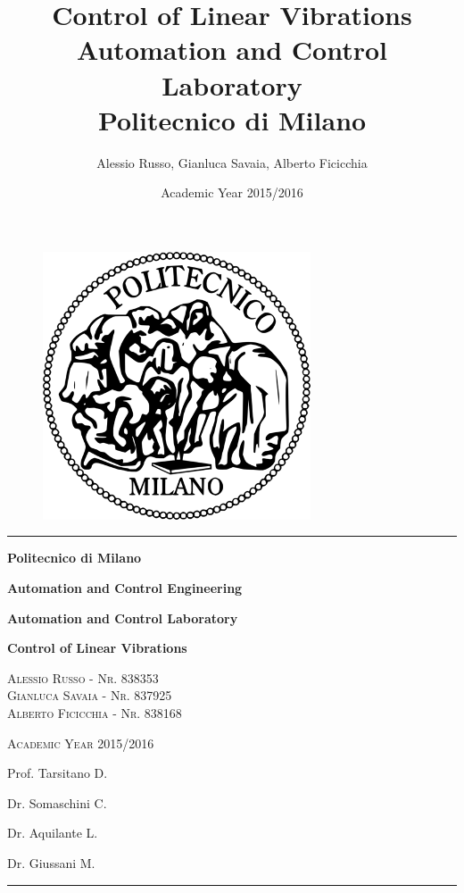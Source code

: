 \documentclass[10pt,a4paper,titlepage]{report}
\author{Alessio Russo, Gianluca Savaia, Alberto Ficicchia}
\title{Control of Linear Vibrations \\
\Large Automation and Control Laboratory \\
 Politecnico di Milano}
\date{Academic Year 2015/2016}
\begin{document}
\begin{titlepage}

\centering		
\vspace{3cm}
\begin{figure}[!h]
\centering
  \includegraphics[scale=0.7]{img/logo.png} 
\end{figure}
\rule{\textwidth}{1pt}
 \par 
\vspace{2cm}
{\Large\bfseries Politecnico di Milano \par}
{\Large\bfseries Automation and Control Engineering\par}
\vspace{2cm}
{\Large\bfseries Automation and Control Laboratory\par}
{\huge\bfseries Control of Linear Vibrations\par}
\vspace{0.3cm}
{\large\scshape Alessio Russo \hspace{8mm} - Nr. 838353 \\ Gianluca Savaia \hspace{3mm} - Nr. 837925 \\ Alberto Ficicchia  - Nr. 838168\par}
\vspace{0.3cm}
{\scshape Academic Year 2015/2016\par}
\vspace{3.5cm}
\hspace{12cm}
{ Prof. Tarsitano D.\par}
\hspace{12cm}
{ Dr. Somaschini C.\par}
\hspace{11.75cm}
{ Dr. Aquilante L.\par}
\hspace{11.65cm}
{ Dr. Giussani M.\par}
\rule{\textwidth}{1pt}
\end{titlepage}
\tableofcontents
\end{document}

